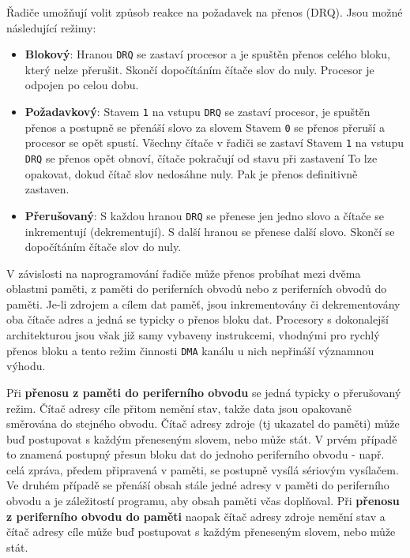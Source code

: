       Řadiče umožňují volit způsob reakce na požadavek na přenos (DRQ). Jsou možné následující režimy:
      \begin{itemize}[noitemsep]
        \item \textbf{Blokový}:  Hranou \texttt{DRQ} se zastaví procesor a je spuštěn přenos celého
              bloku, který nelze přerušit. Skončí dopočítáním čítače slov do nuly. Procesor je 
              odpojen po celou dobu.
        \item \textbf{Požadavkový}: Stavem \texttt{1} na vstupu \texttt{DRQ} se zastaví 
              procesor, je spuštěn přenos a postupně se přenáší slovo za slovem Stavem \texttt{0} 
              se přenos přeruší a procesor se opět spustí. Všechny čítače v řadiči se zastaví 
              Stavem \texttt{1} na vstupu \texttt{DRQ} se přenos opět obnoví, čítače pokračují od 
              stavu při zastavení To lze opakovat, dokud čítač slov nedosáhne nuly. Pak je přenos 
              definitivně zastaven.
        \item \textbf{Přerušovaný}: S každou hranou \texttt{DRQ} se přenese jen jedno slovo a čítače
              se inkrementují (dekrementují). S další hranou se přenese další slovo. Skončí se 
              dopočítáním čítače slov do nuly.
      \end{itemize}
      
      V závislosti na naprogramování řadiče může přenos probíhat mezi dvěma oblastmi paměti, z 
      paměti do periferních obvodů nebo z periferních obvodů do paměti. Je-li zdrojem a cílem dat 
      paměť, jsou inkrementovány či dekrementovány oba čítače adres a jedná se typicky o přenos 
      bloku dat. Procesory s dokonalejší architekturou jsou však již samy vybaveny instrukcemi, 
      vhodnými pro rychlý přenos bloku a tento režim činnosti \texttt{DMA} kanálu u nich nepřináší 
      významnou výhodu.
      
      Při \textbf{přenosu z paměti do periferního obvodu} se jedná typicky o přerušovaný režim. 
      Čítač adresy cíle přitom nemění stav, takže data jsou opakovaně směrována do stejného obvodu. 
      Čítač adresy zdroje (tj ukazatel do paměti) může buď postupovat s každým přeneseným slovem, 
      nebo může stát. V prvém případě to znamená postupný přesun bloku dat do jednoho periferního 
      obvodu - např. celá zpráva, předem připravená v paměti, se postupně vysílá sériovým 
      vysílačem. Ve druhém případě se přenáší obsah stále jedné adresy v paměti do periferního 
      obvodu a je záležitostí programu, aby obsah paměti včas doplňoval. Při \textbf{přenosu z 
      periferního obvodu do paměti} naopak čítač adresy zdroje nemění stav a čítač adresy cíle může 
      buď postupovat s každým přeneseným slovem, nebo může stát.
      
